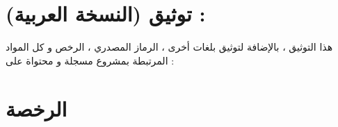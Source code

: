 \documentclass[11pt,a4paper]{report}
\begin{document}
\chapter{توثيق (النسخة العربية) :}
\begin{otherlanguage}{arabic}
\begin{center}
هذا التوثيق ، بالإضافة لتوثيق بلغات أخرى ، الرماز المصدري ، الرخص و كل المواد المرتبطة بمشروع \textit{} مسجلة و محتواة على :
\\
\textit{}
\end{center}
\end{otherlanguage}



\chapter{الرخصة}
\end{document}
